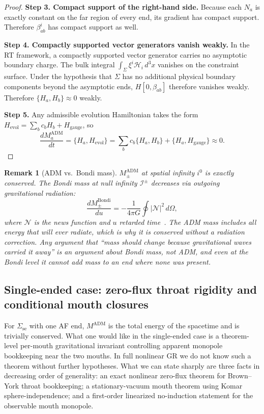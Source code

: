 \documentclass[aps,prd,onecolumn,nofootinbib,superscriptaddress]{revtex4-2}
\newtheorem{remark}{Remark}
\begin{document}
\begin{proof}
\textbf{Step 3. Compact support of the right-hand side.} Because each $N_a$ is
exactly constant on the far region of every end, its gradient has compact
support. Therefore $\beta_{ab}^i$ has compact support as well.

\textbf{Step 4. Compactly supported vector generators vanish weakly.} In the RT
framework, a compactly supported vector generator carries no asymptotic boundary
charge. The bulk integral $\int_\Sigma \xi^i\mathcal{H}_i\,d^3x$ vanishes on
the constraint surface. Under the hypothesis that $\Sigma$ has no additional
physical boundary components beyond the asymptotic ends, $H[0,\beta_{ab}]$
therefore vanishes weakly. Therefore $\{H_a,H_b\}\approx 0$ weakly.

\textbf{Step 5.} Any admissible evolution Hamiltonian takes the form
$H_{\mathrm{evol}}=\sum_b c_b H_b+H_{\mathrm{gauge}}$,
so
\begin{equation}
  \frac{dM_a^{\mathrm{ADM}}}{dt}
  = \{H_a,H_{\mathrm{evol}}\}
  = \sum_b c_b\{H_a,H_b\}+\{H_a,H_{\mathrm{gauge}}\}
  \approx 0.
\end{equation}
\end{proof}

\begin{remark}[ADM vs.\ Bondi mass]
\label{rem:adm-vs-bondi}
$M_\pm^{\mathrm{ADM}}$ at spatial infinity $i^0$ is exactly conserved.  The
Bondi mass at null infinity $\mathcal{I}^\pm$ decreases via outgoing
gravitational radiation:
\begin{equation}
  \frac{dM_\pm^{\mathrm{Bondi}}}{du}
  = -\frac{1}{4\pi G}\oint|\mathcal{N}|^2\,d\Omega,
\end{equation}
where $\mathcal{N}$ is the news function and $u$ retarded
time~\cite{BondiVanderBurgMetzner1962Gravitational,Sachs1962Asymptotic}.
The ADM mass includes all energy that will ever radiate, which is why it is
conserved without a radiation correction.  Any argument that ``mass should
change because gravitational waves carried it away'' is an argument about
Bondi mass, not ADM, and even at the Bondi level it cannot \emph{add} mass to
an end where none was present.
\end{remark}

\subsection{Single-ended case: zero-flux throat rigidity and conditional mouth closures}
\label{sec:adm-single-ended}

For $\Sigma_{\mathrm{se}}$ with one AF end, $M^{\mathrm{ADM}}$ is the total
energy of the spacetime and is trivially conserved.  What one would like in the
single-ended case is a theorem-level per-mouth gravitational invariant
controlling apparent monopole bookkeeping near the two mouths.  In full
nonlinear GR we do not know such a theorem without further hypotheses.  What we
can state sharply are three facts in decreasing order of generality: an exact
nonlinear zero-flux theorem for Brown--York throat bookkeeping; a
stationary-vacuum mouth theorem using Komar sphere-independence; and a
first-order linearized no-induction statement for the observable mouth
monopole.
\end{document}
